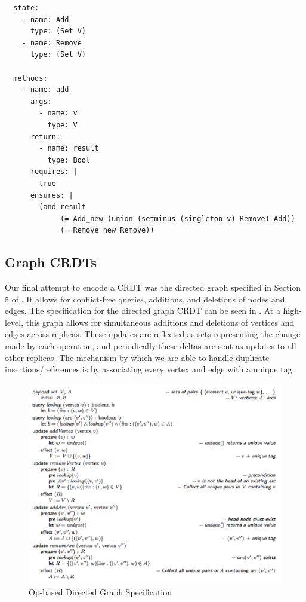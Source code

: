 \documentclass{article}
\begin{document}
\begin{verbatim}
  state:
    - name: Add
      type: (Set V)
    - name: Remove
      type: (Set V)

  methods:
    - name: add
      args:
        - name: v
          type: V
      return:
        - name: result
          type: Bool
      requires: |
        true
      ensures: |
        (and result
             (= Add_new (union (setminus (singleton v) Remove) Add))
             (= Remove_new Remove))
\end{verbatim}

\subsection{Graph CRDTs}

Our final attempt to encode a CRDT was the directed graph specified in Section 5
of \cite{shapiro2011conflict}. It allows for conflict-free queries, additions,
and deletions of nodes and edges. The specification for the directed graph CRDT
can be seen in . At a high-level, this graph allows for
simultaneous additions and deletions of vertices and edges across replicas.
These updates are reflected as sets representing the change made by each
operation, and periodically these deltas are sent as updates to all other
replicas. The mechanism by which we are able to handle duplicate
insertions/references is by associating every vertex and edge with a unique tag.

\begin{figure}[h]
    \centering
    \includegraphics[width=1\textwidth]{directed-graph-def}
    \caption{Op-based Directed Graph Specification}
    \label{fig:graph-def}
\end{figure}
\end{document}
